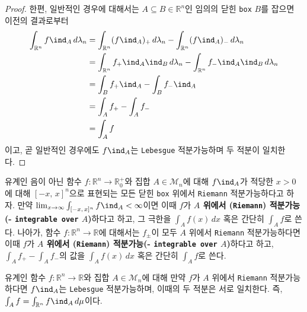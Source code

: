 \begin{proof}
    한편, 일반적인 경우에 대해서는 $A\subseteq B\in\mathbb{R}^n$인 임의의 닫힌 \texttt{box} $B$를 잡으면 이전의 결과로부터
    \begin{align*}
        \int_{\mathbb{R}^n}f\ind_A\,d\lambda_n&=\int_{\mathbb{R}^n}(f\ind_A)_+\,d\lambda_n-\int_{\mathbb{R}^n}(f\ind_A)_-\,d\lambda_n\\
        &=\int_{\mathbb{R}^n}f_+\ind_A\ind_B\,d\lambda_n-\int_{\mathbb{R}^n}f_-\ind_A\ind_B\,d\lambda_n\\
        &=\int_Bf_+\ind_A-\int_Bf_-\ind_A\\
        &=\int_Af_+-\int_Af_-\\
        &=\int_Af
    \end{align*}
    이고, 곧 일반적인 경우에도 $f\ind_A$는 \texttt{Lebesgue} 적분가능하며 두 적분이 일치한다.
\end{proof}

\begin{definition}
    유계인 음이 아닌 함수 $f:\mathbb{R}^n\to\mathbb{R}^+_0$와 집합 $A\in\mathcal{M}_n$에 대해 $f\ind_A$가 적당한 $x>0$에 대해 $[-x,\,x]^n$으로 표현되는 모든 닫힌 \texttt{box} 위에서 \texttt{Riemann} 적분가능하다고 하자. 만약 $\lim_{x\to\infty}\int_{[-x,\,x]^n}f\ind_A<\infty$이면 이때 $f$가 \textbf{$A$ 위에서 (\texttt{Riemann}) 적분가능(- \texttt{integrable over} $A$)}하다고 하고, 그 극한을 $\int_Af(x)\,dx$ 혹은 간단히 $\int_Af$로 쓴다. 나아가, 함수 $f:\mathbb{R}^n\to\mathbb{R}$에 대해서는 $f_\pm$이 모두 $A$ 위에서 \texttt{Riemann} 적분가능하다면 이때 $f$가 \textbf{$A$ 위에서 (\texttt{Riemann}) 적분가능(- \texttt{integrable over} $A$)}하다고 하고, $\int_Af_+-\int_Af_-$의 값을 $\int_Af(x)\,dx$ 혹은 간단히 $\int_Af$로 쓴다.
\end{definition}

\begin{theorem}\label{thm:ReimannIntegrable2}
    유계인 함수 $f:\mathbb{R}^n\to\mathbb{R}$와 집합 $A\in\mathcal{M}_n$에 대해 만약 $f$가 $A$ 위에서 \texttt{Riemann} 적분가능하다면 $f\ind_A$는 \texttt{Lebesgue} 적분가능하며, 이때의 두 적분은 서로 일치한다. 즉, $\int_Af=\int_{\mathbb{R}^n}f\ind_A\,d\mu$이다.
\end{theorem}

